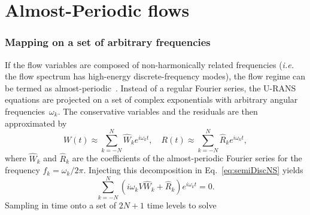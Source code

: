 \section{Almost-Periodic flows} %
\label{sec:almost_periodic_flows}

\subsubsection{Mapping on a set of arbitrary frequencies}
\label{sec:mapping-an-arbitrary}

If the flow variables are composed of non-harmonically related
frequencies (\emph{i.e.} the flow spectrum has high-energy
discrete-frequency modes), the flow regime can be termed as
almost-periodic~\cite{Besicovitch:1954qy}. Instead of a regular
Fourier series, the U-RANS equations are projected on a set of
complex exponentials with arbitrary angular frequencies~$\omega_k$.
The conservative variables and the residuals are then approximated by
\begin{equation}
   W(t) \approx \sum_{k=-N}^{N} \widehat{W}_k e^{i \omega_k t},\quad
   R(t) \approx \sum_{k=-N}^{N} \widehat{R}_k e^{i \omega_k t},
   \label{eq:fourierW}
\end{equation}
where $\widehat{W}_k$ and $\widehat{R}_k$ are the coefficients of the
almost-periodic Fourier series for the frequency $f_k = \omega_k/2\pi$.
Injecting this decomposition in Eq.~\eqref{eq:semiDiscNS} yields
\begin{equation}
    \sum_{k=-N}^{N} \left(i \omega_k V \widehat{W}_k + \widehat{R}_k
    \right) e^{i \omega_k t} =0.
   \label{eq:fourierNS_2}
\end{equation}
Sampling in time onto a set of $2 N + 1$ time levels to solve
